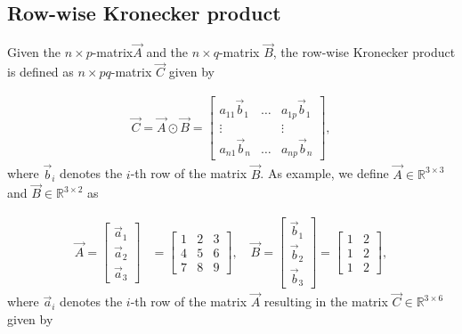 \begin{appendices}
\section{Row-wise Kronecker product} \label{apx:AppendixKroneckerRowWise}

Given the $n \times p$-matrix$\vec{A}$ and the $n \times q$-matrix $\vec{B}$, the row-wise Kronecker product is defined as $n \times pq$-matrix $\vec{C}$ given by

\begin{align}
	\vec{C} = \vec{A} \odot \vec{B} = 
			\begin{bmatrix}
				a_{11} \vec{b}_1 & \dots & a_{1p} \vec{b}_1 \\
				\vdots 	   &         &  \vdots \\
				a_{n1} \vec{b}_n & \dots  & a_{np} \vec{b}_n     
			\end{bmatrix},
\end{align}
%
where $\vec{b}_i$ denotes the $i$-th row of the matrix $\vec{B}$. As example, we define $\vec{A} \in \mathbb{R}^{3 \times 3}$ and $\vec{B} \in \mathbb{R}^{3 \times 2}$ as

\begin{align}
	\vec{A} = 
		\begin{bmatrix}
			\vec{a}_1 \\
			\vec{a}_2 \\
			\vec{a}_3 
		\end{bmatrix} &= 
		\begin{bmatrix}
			1 & 2 & 3 \\
			4 & 5 & 6 \\
			7 & 8 & 9 
		\end{bmatrix}, \quad 
	\vec{B} = 
		\begin{bmatrix}
			\vec{b}_1 \\
			\vec{b}_2 \\
			\vec{b}_3 
		\end{bmatrix} = 
		\begin{bmatrix}
			1 & 2  \\
			1 & 2  \\
			1 & 2  
		\end{bmatrix},
\end{align}
%
where $\vec{a}_i$ denotes the $i$-th row of the matrix $\vec{A}$ resulting in the matrix $\vec{C} \in \mathbb{R}^{3 \times 6}$ given by


\end{appendices}
